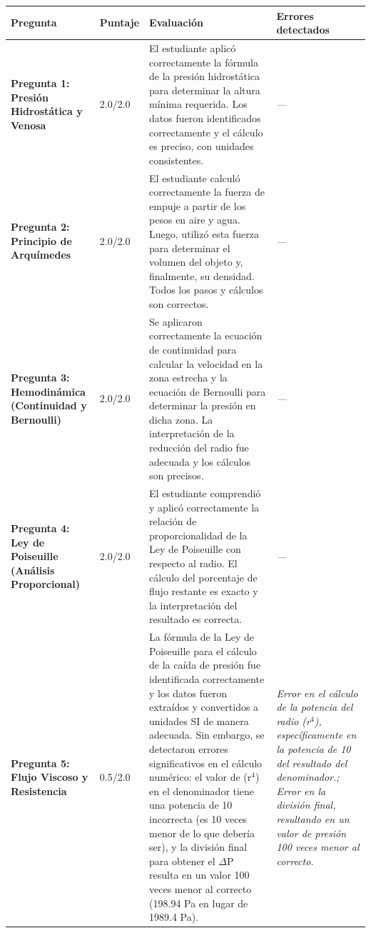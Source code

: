 \documentclass[11pt,a4paper]{article}
\begin{document}
\begin{longtable}{>{\bfseries}p{2.8cm} p{1.6cm} p{7.0cm} p{2.8cm}}
  \toprule
  \textbf{Pregunta} & \textbf{Puntaje} & \textbf{Evaluación} & \textbf{Errores detectados} \\
  \midrule
  \endhead
  \bottomrule
  \endfoot
    \textbf{Pregunta 1: Presión Hidrostática y Venosa} & 2.0/2.0 & El estudiante aplicó correctamente la fórmula de la presión hidrostática para determinar la altura mínima requerida. Los datos fueron identificados correctamente y el cálculo es preciso, con unidades consistentes. & \textit{---} \\
    \midrule
    \textbf{Pregunta 2: Principio de Arquímedes} & 2.0/2.0 & El estudiante calculó correctamente la fuerza de empuje a partir de los pesos en aire y agua. Luego, utilizó esta fuerza para determinar el volumen del objeto y, finalmente, su densidad. Todos los pasos y cálculos son correctos. & \textit{---} \\
    \midrule
    \textbf{Pregunta 3: Hemodinámica (Continuidad y Bernoulli)} & 2.0/2.0 & Se aplicaron correctamente la ecuación de continuidad para calcular la velocidad en la zona estrecha y la ecuación de Bernoulli para determinar la presión en dicha zona. La interpretación de la reducción del radio fue adecuada y los cálculos son precisos. & \textit{---} \\
    \midrule
    \textbf{Pregunta 4: Ley de Poiseuille (Análisis Proporcional)} & 2.0/2.0 & El estudiante comprendió y aplicó correctamente la relación de proporcionalidad de la Ley de Poiseuille con respecto al radio. El cálculo del porcentaje de flujo restante es exacto y la interpretación del resultado es correcta. & \textit{---} \\
    \midrule
    \textbf{Pregunta 5: Flujo Viscoso y Resistencia} & 0.5/2.0 & La fórmula de la Ley de Poiseuille para el cálculo de la caída de presión fue identificada correctamente y los datos fueron extraídos y convertidos a unidades SI de manera adecuada. Sin embargo, se detectaron errores significativos en el cálculo numérico: el valor de (r$^{4}$) en el denominador tiene una potencia de 10 incorrecta (es 10 veces menor de lo que debería ser), y la división final para obtener el $\Delta$P resulta en un valor 100 veces menor al correcto (198.94 Pa en lugar de 1989.4 Pa). & \textit{Error en el cálculo de la potencia del radio (r$^{4}$), específicamente en la potencia de 10 del resultado del denominador.; Error en la división final, resultando en un valor de presión 100 veces menor al correcto.} \\
    \midrule
\end{longtable}
\end{document}
